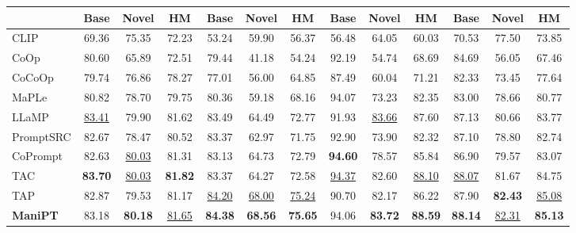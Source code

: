 \documentclass{article}
\theoremstyle{plain}
\theoremstyle{definition}
\theoremstyle{remark}
\begin{document}
\begin{table}[t!]
{\begin{tabular}{l ccc|ccc|ccc|ccc}
				& Base & Novel & HM & Base & Novel & HM & Base & Novel & HM & Base & Novel & HM \\
				\midrule
				CLIP       & 69.36 & 75.35 & 72.23 & 53.24 & 59.90 & 56.37 & 56.48 & 64.05 & 60.03 & 70.53 & 77.50 & 73.85 \\
				CoOp       & 80.60 & 65.89 & 72.51 & 79.44 & 41.18 & 54.24 & 92.19 & 54.74 & 68.69 & 84.69 & 56.05 & 67.46 \\
				CoCoOp     & 79.74 & 76.86 & 78.27 & 77.01 & 56.00 & 64.85 & 87.49 & 60.04 & 71.21 & 82.33 & 73.45 & 77.64 \\
				MaPLe      & 80.82 & 78.70 & 79.75 & 80.36 & 59.18 & 68.16 & 94.07 & 73.23 & 82.35 & 83.00 & 78.66 & 80.77 \\
				LLaMP      & \underline{83.41} & 79.90 & 81.62 & 83.49 & 64.49 & 72.77 & 91.93 & \underline{83.66} & 87.60 & 87.13 & 80.66 & 83.77 \\
				PromptSRC  & 82.67 & 78.47 & 80.52 & 83.37 & 62.97 & 71.75 & 92.90 & 73.90 & 82.32 & 87.10 & 78.80 & 82.74 \\
				CoPrompt   & 82.63 & \underline{80.03} & 81.31 & 83.13 & 64.73 & 72.79 & \textbf{94.60} & 78.57 & 85.84 & 86.90 & 79.57 & 83.07 \\
				TAC        & \textbf{83.70} & \underline{80.03} & \textbf{81.82} & 83.37 & 64.27 & 72.58 & \underline{94.37} & 82.60 & \underline{88.10} & \underline{88.07} & 81.67 & 84.75 \\
				TAP        & 82.87 & 79.53 & 81.17 & \underline{84.20} & \underline{68.00} & \underline{75.24} & 90.70 & 82.17 & 86.22 & 87.90 & \textbf{82.43} & \underline{85.08} \\
				\rowcolor{gray!20}\textbf{ManiPT} & 83.18 & \textbf{80.18} & \underline{81.65} & \textbf{84.38} & \textbf{68.56} & \textbf{75.65} & 94.06 & \textbf{83.72} & \textbf{88.59} & \textbf{88.14} & \underline{82.31} & \textbf{85.13} \\
				\bottomrule
			\end{tabular}
		}
		\vspace{-15pt}
	\end{table}
\end{document}
